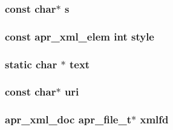 \subsubsection[{\texorpdfstring{s}{s}}]{\setlength{\rightskip}{0pt plus 5cm}const char$\ast$ s}\hypertarget{group__APR__Util__XML_gab87f55bd0280d90925050a4188c14ab5}{}\label{group__APR__Util__XML_gab87f55bd0280d90925050a4188c14ab5}
\subsubsection[{\texorpdfstring{style}{style}}]{\setlength{\rightskip}{0pt plus 5cm}const {\bf apr\+\_\+xml\+\_\+elem} {\bf int} style}\hypertarget{group__APR__Util__XML_gac1f70a476bd79849143813436ef34a26}{}\label{group__APR__Util__XML_gac1f70a476bd79849143813436ef34a26}
\subsubsection[{\texorpdfstring{text}{text}}]{\setlength{\rightskip}{0pt plus 5cm}static char $\ast$ text}\hypertarget{group__APR__Util__XML_ga6f353ddc97cf6dc93417f58016afe82c}{}\label{group__APR__Util__XML_ga6f353ddc97cf6dc93417f58016afe82c}
\subsubsection[{\texorpdfstring{uri}{uri}}]{\setlength{\rightskip}{0pt plus 5cm}const char$\ast$ uri}\hypertarget{group__APR__Util__XML_ga69ec24fb2d0a5f5e532deb9adaab81d6}{}\label{group__APR__Util__XML_ga69ec24fb2d0a5f5e532deb9adaab81d6}
\subsubsection[{\texorpdfstring{xmlfd}{xmlfd}}]{ {\bf apr\+\_\+xml\+\_\+doc} {\bf apr\+\_\+file\+\_\+t}$\ast$ xmlfd}\hypertarget{group__APR__Util__XML_gaca3c8f1a059f6838f226f0c4879c0782}{}\label{group__APR__Util__XML_gaca3c8f1a059f6838f226f0c4879c0782}
